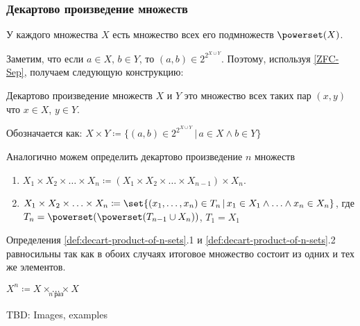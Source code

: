 \documentclass{article}
\begin{document}
\subsubsection{Декартово произведение множеств}
    У каждого множества \(X\) есть множество всех его подмножеств \(\powerset(X)\). 

    Заметим, что если \(a \in X,\, b \in Y\), то \((a, b) \in 2^{2^{X \cup Y}}\). Поэтому, используя \ref{ZFC-Sep}, получаем следующую конструкцию: 
    \begin{definition}
        \label{def:decart-product}
        Декартово произведение множеств \(X\) и \(Y\) это множество всех таких пар \((x, y)\) что \(x \in X\), \(y \in Y\). 
        
        Обозначается как: \(X \times Y \coloneq \{(a,b) \in 2^{2^{X \cup Y}}\,|\, a \in X \land b \in Y\}\)
    \end{definition}
    \begin{definition}
        \label{def:decart-product-of-n-sets}
        Аналогично можем определить декартово произведение \(n\) множеств
        \begin{enumerate}
            \item \(X_1 \times X_2 \times\ldots\times X_n \coloneq (X_1 \times X_2 \times\ldots\times X_{n-1})\times X_n\).
            \item \(X_1 \times X_2 \times\ldots\times X_n \coloneq \set{(x_1,\ldots,x_n) \in T_n\,|\, x_1 \in X_1 \land\ldots\land x_n \in X_n}\), где \(T_n = \powerset(\powerset(T_{n-1}\cup X_n))\), \(T_1 = X_1\)
        \end{enumerate}
    \end{definition}
    \begin{remark}
        \label{rem:equal-defs-of-decart-product}
        Определения \ref{def:decart-product-of-n-sets}.1 и  \ref{def:decart-product-of-n-sets}.2 равносильны так как в обоих случаях итоговое множество состоит из одних и тех же элементов.
    \end{remark}
    \begin{defnotation}
        \(X^n \coloneq \underset{n\ \text{раз}}{X \times\ldots\times X}\)
    \end{defnotation}

    TBD: Images, examples

    
\end{document}
